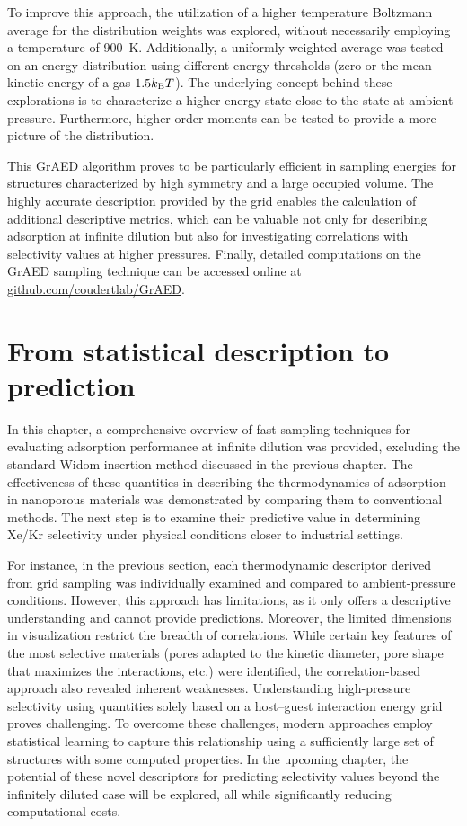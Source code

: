 \documentclass[main]{subfiles}
\begin{document}
To improve this approach, the utilization of a higher temperature Boltzmann average for the distribution weights was explored, without necessarily employing a temperature of \SI{900}{\kelvin}. Additionally, a uniformly weighted average was tested on an energy distribution using different energy thresholds (zero or the mean kinetic energy of a gas $1.5k_{\text{B}}T$). The underlying concept behind these explorations is to characterize a higher energy state close to the state at ambient pressure. Furthermore, higher-order moments can be tested to provide a more picture of the distribution. 

\vspace{2cm}

This GrAED algorithm proves to be particularly efficient in sampling energies for structures characterized by high symmetry and a large occupied volume. The highly accurate description provided by the grid enables the calculation of additional descriptive metrics, which can be valuable not only for describing adsorption at infinite dilution but also for investigating correlations with selectivity values at higher pressures. Finally, detailed computations on the GrAED sampling technique can be accessed online at \url{github.com/coudertlab/GrAED}.


\section{From statistical description to prediction}

In this chapter, a comprehensive overview of fast sampling techniques for evaluating adsorption performance at infinite dilution was provided, excluding the standard Widom insertion method discussed in the previous chapter. The effectiveness of these quantities in describing the thermodynamics of adsorption in nanoporous materials was demonstrated by comparing them to conventional methods. The next step is to examine their predictive value in determining Xe/Kr selectivity under physical conditions closer to industrial settings.

For instance, in the previous section, each thermodynamic descriptor derived from grid sampling was individually examined and compared to ambient-pressure conditions. However, this approach has limitations, as it only offers a descriptive understanding and cannot provide predictions. Moreover, the limited dimensions in visualization restrict the breadth of correlations. While certain key features of the most selective materials (pores adapted to the kinetic diameter, pore shape that maximizes the interactions, etc.) were identified, the correlation-based approach also revealed inherent weaknesses. Understanding high-pressure selectivity using quantities solely based on a host--guest interaction energy grid proves challenging. To overcome these challenges, modern approaches employ statistical learning to capture this relationship using a sufficiently large set of structures with some computed properties. In the upcoming chapter, the potential of these novel descriptors for predicting selectivity values beyond the infinitely diluted case will be explored, all while significantly reducing computational costs.


\OnlyInSubfile{\printglobalbibliography}
\end{document}
